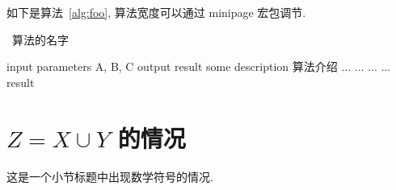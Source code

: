 如下是算法~\ref{alg:foo}, 算法宽度可以通过 minipage 宏包调节.
\begin{center}
\vspace{-2ex}
\begin{minipage}{.9\linewidth}
\begin{algorithm}[H]
\caption{~算法的名字}\label{alg:foo}
\begin{algorithmic}[1]
\Require input parameters A, B, C
\Ensure output result
\State some description 算法介绍
  \State ...
    \State ...
    \Else
    \State ...
  \EndIf
\EndFor
{}
  \State ...
\EndWhile
\State \Return result
\end{algorithmic}
\end{algorithm}
\end{minipage}
\end{center}


\section{\texorpdfstring{{\boldmath$Z=X \cup Y$}}{Z = X union Y} 的情况}

这是一个小节标题中出现数学符号的情况.

